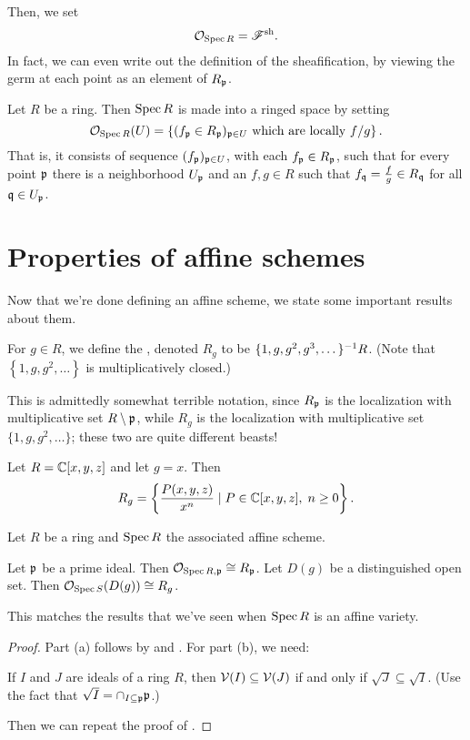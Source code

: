 Then, we set \[ \mathcal O_{\operatorname{Spec} R} = \mathscr F^\mathrm{sh}. \]
In fact, we can even write out the definition of the sheafification,
by viewing the germ at each point as an element of $R_\mathfrak p$.
\begin{definition}
	Let $R$ be a ring. Then $\operatorname{Spec} R$ is made into a ringed space by setting
	\[ \mathcal O_{\operatorname{Spec} R}(U) 
		= \left\{ (f_\mathfrak p \in R_\mathfrak p)_{\mathfrak p \in U}
		\text{ which are locally $f/g$} \right\}. \]
	That is, it consists of sequence $(f_\mathfrak p)_{\mathfrak p \in U}$, with
	each $f_\mathfrak p \in R_\mathfrak p$, such that for every point $\mathfrak p$ there
	is a neighborhood $U_\mathfrak p$ and an $f,g \in R$ such that
	$f_\mathfrak q = \frac fg \in R_\mathfrak q$ for all $\mathfrak q \in U_\mathfrak p$.
\end{definition}

\section{Properties of affine schemes}
Now that we're done defining an affine scheme,
we state some important results about them.

\begin{definition}
	For $g \in R$, we define the ,
	denoted $R_g$ to be $\{1, g, g^2, g^3, \dots\}^{-1} R$.
	(Note that $\left\{ 1, g, g^2, \dots \right\}$ is multiplicatively closed.)
\end{definition}
This is admittedly somewhat terrible notation, since $R_\mathfrak p$
is the localization with multiplicative set $R \setminus \mathfrak p$,
while $R_g$ is the localization with multiplicative set $\{1,g,g^2,\dots\}$;
these two are quite different beasts!

\begin{example}
	Let $R = \mathbb C[x,y,z]$ and let $g = x$.
	Then
	\[ R_g = \left\{ \frac{P(x,y,z)}{x^n} \mid
		P \in \mathbb C[x,y,z], \; n \ge 0 \right\}. \]
\end{example}
\begin{theorem}
	Let $R$ be a ring and $\operatorname{Spec} R$ the associated affine scheme.
	\begin{enumerate}[(a)]
		\ii Let $\mathfrak p$ be a prime ideal.
		Then $\mathcal O_{\operatorname{Spec} R, \mathfrak p} \cong R_\mathfrak p$.
		\ii Let $D(g)$ be a distinguished open set.
		Then $\mathcal O_{\operatorname{Spec} S}(D(g)) \cong R_g$.
	\end{enumerate}
	\label{thm:affine_struct_master}
\end{theorem}
This matches the results that we've seen when $\operatorname{Spec} R$ is an affine variety.
\begin{proof}
	Part (a) follows by 
	and .
	For part (b), we need:
	\begin{ques}
		If $I$ and $J$ are ideals of a ring $R$,
		then $\mathcal V(I) \subseteq \mathcal V(J)$ if and only if
		$\sqrt{J} \subseteq \sqrt{I}$.
		(Use the fact that $\sqrt I = \cap_{I \subseteq \mathfrak p} \mathfrak p$.)
	\end{ques}
	Then we can repeat the proof of .
\end{proof}

